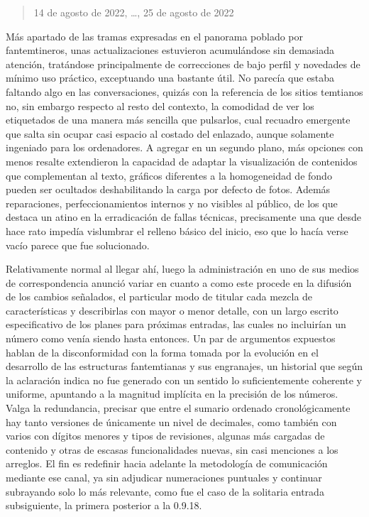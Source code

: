 \documentclass[
]{book}
\begin{document}
\begin{quote}
14 de agosto de 2022, \ldots, 25 de agosto de 2022
\end{quote}

Más apartado de las tramas expresadas en el panorama poblado por fantemtineros, unas actualizaciones estuvieron acumulándose sin demasiada atención, tratándose principalmente de correcciones de bajo perfil y novedades de mínimo uso práctico, exceptuando una bastante útil. No parecía que estaba faltando algo en las conversaciones, quizás con la referencia de los sitios temtianos no, sin embargo respecto al resto del contexto, la comodidad de ver los etiquetados de una manera más sencilla que pulsarlos, cual recuadro emergente que salta sin ocupar casi espacio al costado del enlazado, aunque solamente ingeniado para los ordenadores. A agregar en un segundo plano, más opciones con menos resalte extendieron la capacidad de adaptar la visualización de contenidos que complementan al texto, gráficos diferentes a la homogeneidad de fondo pueden ser ocultados deshabilitando la carga por defecto de fotos. Además reparaciones, perfeccionamientos internos y no visibles al público, de los que destaca un atino en la erradicación de fallas técnicas, precisamente una que desde hace rato impedía vislumbrar el relleno básico del inicio, eso que lo hacía verse vacío parece que fue solucionado.

Relativamente normal al llegar ahí, luego la administración en uno de sus medios de correspondencia anunció variar en cuanto a como este procede en la difusión de los cambios señalados, el particular modo de titular cada mezcla de características y describirlas con mayor o menor detalle, con un largo escrito especificativo de los planes para próximas entradas, las cuales no incluirían un número como venía siendo hasta entonces. Un par de argumentos expuestos hablan de la disconformidad con la forma tomada por la evolución en el desarrollo de las estructuras fantemtianas y sus engranajes, un historial que según la aclaración indica no fue generado con un sentido lo suficientemente coherente y uniforme, apuntando a la magnitud implícita en la precisión de los números. Valga la redundancia, precisar que entre el sumario ordenado cronológicamente hay tanto versiones de únicamente un nivel de decimales, como también con varios con dígitos menores y tipos de revisiones, algunas más cargadas de contenido y otras de escasas funcionalidades nuevas, sin casi menciones a los arreglos. El fin es redefinir hacia adelante la metodología de comunicación mediante ese canal, ya sin adjudicar numeraciones puntuales y continuar subrayando solo lo más relevante, como fue el caso de la solitaria entrada subsiguiente, la primera posterior a la 0.9.18.
\end{document}
